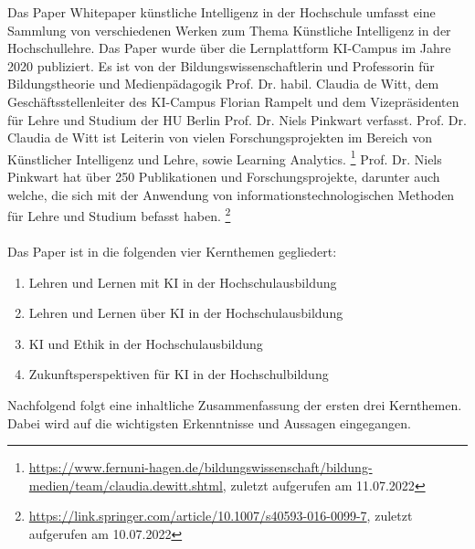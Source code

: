 
Das Paper \glqq{}Whitepaper künstliche Intelligenz in der Hochschule\grqq{} umfasst eine Sammlung von verschiedenen Werken zum Thema Künstliche Intelligenz in der Hochschullehre. Das Paper wurde über die Lernplattform KI-Campus im Jahre 2020 publiziert. Es ist von der Bildungswissenschaftlerin und Professorin für Bildungstheorie und Medienpädagogik Prof. Dr. habil. Claudia de Witt, dem Geschäftsstellenleiter des KI-Campus Florian Rampelt und dem Vizepräsidenten für Lehre und Studium der HU Berlin Prof. Dr. Niels Pinkwart verfasst. Prof. Dr. Claudia de Witt ist Leiterin von vielen Forschungsprojekten im Bereich von Künstlicher Intelligenz und Lehre, sowie Learning Analytics. \footnote{\url{https://www.fernuni-hagen.de/bildungswissenschaft/bildung-medien/team/claudia.dewitt.shtml}, zuletzt aufgerufen am 11.07.2022} Prof. Dr. Niels Pinkwart hat über 250 Publikationen und Forschungsprojekte, darunter auch welche, die sich mit der Anwendung von informationstechnologischen Methoden für Lehre und Studium befasst haben. \footnote{\url{https://link.springer.com/article/10.1007/s40593-016-0099-7}, zuletzt aufgerufen am
    10.07.2022}
\\ \\ \noindent
Das Paper ist in die folgenden vier Kernthemen gegliedert:
\begin{enumerate}
    \item Lehren und Lernen mit KI in der Hochschulausbildung
    \item Lehren und Lernen über KI in der Hochschulausbildung
    \item KI und Ethik in der Hochschulausbildung
    \item Zukunftsperspektiven für KI in der Hochschulbildung
\end{enumerate}
\noindent
Nachfolgend folgt eine inhaltliche Zusammenfassung der ersten drei Kernthemen. Dabei wird auf die wichtigsten Erkenntnisse und Aussagen eingegangen.

